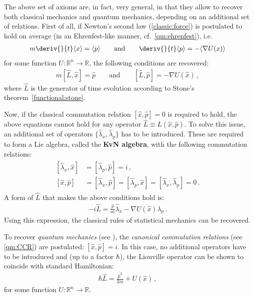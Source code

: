     \begin{property}[Generality]
        The above set of axioms are, in fact, very general, in that they allow to recover both classical mechanics and quantum mechanics, depending on an additional set of relations. First of all, if Newton's second law (\cref{classic:force}) is postulated to hold on average (in an Ehrenfest-like manner, cf.~\cref{qm:ehrenfest}), i.e.
        \begin{gather}
            m\deriv{}{t}\langle x\rangle=\langle p\rangle \qquad\text{and}\qquad \deriv{}{t}\langle p\rangle=-\langle\nabla U(x)\rangle
        \end{gather}
        for some function $U:\mathbb{R}^n\rightarrow\mathbb{R}$, the following conditions are recovered:
        \begin{gather}
            m[\widehat{L},\widehat{x}]=\widehat{p} \qquad\text{and}\qquad [\widehat{L},\widehat{p}]=-\nabla U(\widehat{x})\,,
        \end{gather}
        where $\widehat{L}$ is the generator of time evolution according to Stone's theorem~\ref{functional:stone}.

        Now, if the classical commutation relation $[\widehat{x},\widehat{p}]=0$ is required to hold, the above equations cannot hold for any operator $\widehat{L}\equiv L(\widehat{x},\widehat{p})$. To solve this issue, an additional set of operators $\{\widehat{\lambda}_x,\widehat{\lambda}_p\}$ has to be introduced. These are required to form a Lie algebra, called the \textbf{KvN algebra}, with the following commutation relations:
        \begin{gather}
            \begin{aligned}
                [\widehat{\lambda}_x,\widehat{x}] &= [\widehat{\lambda}_p,\widehat{p}] = i\,,\\
                [\widehat{x},\widehat{p}] &= [\widehat{\lambda}_x,\widehat{p}] = [\widehat{\lambda}_p,\widehat{x}] = [\widehat{\lambda}_x,\widehat{\lambda}_p] = 0\,.
            \end{aligned}
        \end{gather}
        A form of $\widehat{L}$ that makes the above conditions hold is:
        \begin{gather}
            -i\widehat{L} = \frac{\widehat{p}}{m}\widehat{\lambda}_x - \nabla U(\widehat{x})\widehat{\lambda}_p\,.
        \end{gather}
        Using this expression, the classical rules of statistical mechanics can be recovered.

        To recover \textit{quantum mechanics} (see ), the \textit{canonical commutation relations} (see \cref{qm:CCR}) are postulated: $[\widehat{x},\widehat{p}]=i$. In this case, no additional operators have to be introduced and (up to a factor $\hbar$), the Liouville operator can be shown to coincide with standard Hamiltonian:
        \begin{gather}
            \hbar\widehat{L} = \frac{\widehat{p}^2}{2m}+U(\widehat{x})\,,
        \end{gather}
        for some function $U:\mathbb{R}^n\rightarrow\mathbb{R}$.
    \end{property}

